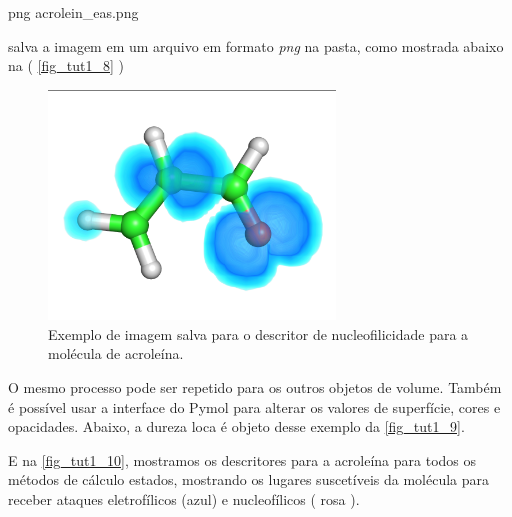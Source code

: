\documentclass[a4paper,11pt]{refart}
\begin{document}
\hspace*{-\leftmarginwidth}
\begin{minipage}{\fullwidth}
	\begin{pymol}png acrolein_eas.png\end{pymol}
\end{minipage}

salva a imagem em um arquivo em formato \textit{png} na pasta, como mostrada abaixo na ( \autoref{fig_tut1_8} )


\hspace*{-\leftmarginwidth}
\begin{minipage}{\fullwidth}
\begin{figure}[H]
\begin{center}
\includegraphics[width=3in]{images/img9}
\caption{Exemplo de imagem salva para o descritor de nucleofilicidade para a molécula de acroleína.}
\label{fig_tut1_8}
\end{center}
\end{figure}
\end{minipage}

O mesmo processo pode ser repetido para os outros objetos de volume. Também é possível usar a interface do Pymol para alterar os valores de superfície, cores e opacidades. Abaixo, a dureza loca é objeto desse exemplo da \autoref{fig_tut1_9}.

E na \autoref{fig_tut1_10}, mostramos os descritores para a acroleína para todos os métodos de cálculo estados, mostrando os lugares suscetíveis da molécula para receber ataques eletrofílicos (azul) e nucleofílicos ( rosa ).
\end{document}
